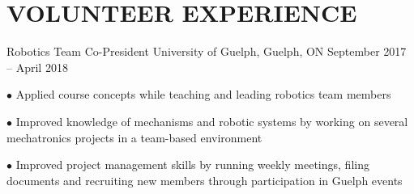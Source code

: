 \documentclass[a4paper,11pt]{article}
\newcommand{\sectionsep}{\vspace{-2.5mm}}
\begin{document}
\resumeSubHeadingListEnd
\sectionsep
\section{VOLUNTEER EXPERIENCE}
\resumeSubHeadingListStart

\resumeExp
{Robotics Team Co-President}
{University of Guelph, Guelph, ON}
{September 2017 -- April 2018} %
{}
\resumeItemListStart
\item[$\bullet$] Applied course concepts while teaching and leading robotics team members
\item[$\bullet$] Improved knowledge of mechanisms and robotic systems by working on several mechatronics
projects in a team-based environment
\item[$\bullet$] Improved project management skills by running weekly meetings, filing documents and
recruiting new members through participation in Guelph events
\resumeItemListEnd
\resumeSubHeadingListEnd

\end{document}
